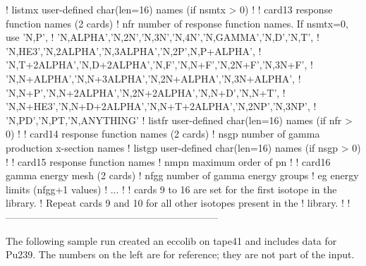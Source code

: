 \begin{ccode}
  !   listmx    user-defined char(len=16) names (if nsmtx > 0)
  !
  ! card13 response function names (2 cards)
  !   nfr       number of response function names. If nsmtx=0, use 'N,P',
  !             'N,ALPHA','N,2N','N,3N','N,4N','N,GAMMA','N,D','N,T',
  !             'N,HE3','N,2ALPHA','N,3ALPHA','N,2P',N,P+ALPHA',
  !             'N,T+2ALPHA','N,D+2ALPHA','N,F','N,N+F','N,2N+F','N,3N+F',
  !             'N,N+ALPHA','N,N+3ALPHA','N,2N+ALPHA','N,3N+ALPHA',
  !             'N,N+P','N,N+2ALPHA','N,2N+2ALPHA','N,N+D','N,N+T',
  !             'N,N+HE3','N,N+D+2ALPHA','N,N+T+2ALPHA','N,2NP','N,3NP',
  !             'N,PD','N,PT,’N,ANYTHING’
  !   listfr    user-defined char(len=16) names (if nfr > 0)
  !
  ! card14 response function names (2 cards)
  !   nsgp      number of gamma production x-section names
  !   listgp    user-defined char(len=16) names (if nsgp > 0)
  !
  ! card15 response function names
  !   nmpn      maximum order of pn
  !
  ! card16      gamma energy mesh (2 cards)
  !   nfgg      number of gamma energy groups
  !   eg        energy limits (nfgg+1 values)
  !  ...
  !
  !            cards 9 to 16 are set for the first isotope in the library.
  !            Repeat cards 9 and 10 for all other isotopes present in the
  !            library.
  !
  !-----------------------------------------------------------------

\end{ccode}
\normalsize

The following sample run created an eccolib on tape41 and includes data for
Pu239. The numbers on the left are for reference; they are not part of the
input.

